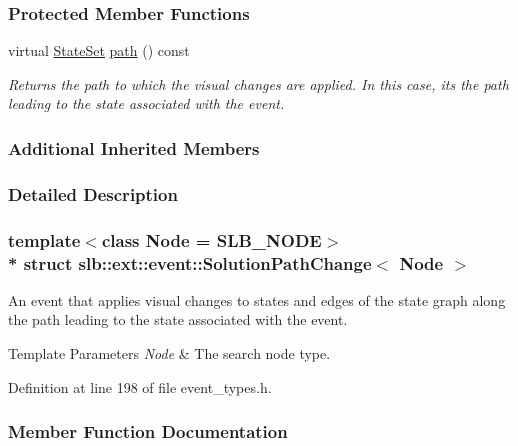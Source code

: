 \subsubsection*{Protected Member Functions}
\begin{DoxyCompactItemize}
\item 
virtual \hyperlink{structslb_1_1ext_1_1event_1_1UniformChange_a2c45514041ea86f77bbd0147fe06babd}{State\+Set} \hyperlink{structslb_1_1ext_1_1event_1_1SolutionPathChange_a3e43f9b1a09bd069aad8561723e62f35}{path} () const 
\begin{DoxyCompactList}\small\item\em Returns the path to which the visual changes are applied. In this case, it\textquotesingle{}s the path leading to the state associated with the event. \end{DoxyCompactList}\end{DoxyCompactItemize}
\subsubsection*{Additional Inherited Members}


\subsubsection{Detailed Description}
\subsubsection*{template$<$class Node = S\+L\+B\+\_\+\+N\+O\+DE$>$\\*
struct slb\+::ext\+::event\+::\+Solution\+Path\+Change$<$ Node $>$}

An event that applies visual changes to states and edges of the state graph along the path leading to the state associated with the event. 


\begin{DoxyTemplParams}{Template Parameters}
{\em Node} & The search node type. \\
\hline
\end{DoxyTemplParams}


Definition at line 198 of file event\+\_\+types.\+h.



\subsubsection{Member Function Documentation}
